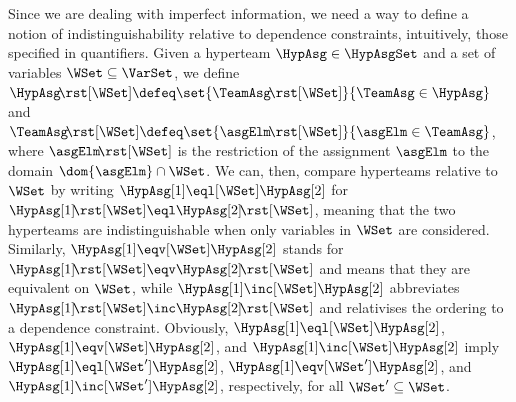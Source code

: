 \documentclass[authoryear]{elsarticle}
\begin{document}
Since we are dealing with imperfect information, we need a way to define a
notion of indistinguishability relative to dependence constraints, intuitively,
those specified in quantifiers.
Given a hyperteam $\HypAsg \in \HypAsgSet$ and a set of variables $\WSet
\subseteq \VarSet$, we define $\HypAsg \!\rst[\WSet] \defeq \allowbreak \set{
\TeamAsg \!\rst[\WSet] }{ \TeamAsg \in \HypAsg }$ and $\TeamAsg \!\rst[\WSet]
\defeq \allowbreak \set{ \asgElm \!\rst[\WSet] }{ \asgElm \in \TeamAsg }$, where
$\asgElm \!\rst[\WSet]$ is the restriction of the assignment $\asgElm$ to the
domain $\dom{\asgElm} \cap \WSet$.
%
We can, then, compare hyperteams relative to $\WSet$ by writing $\HypAsg[1]
\eql[\WSet] \HypAsg[2]$ for $\HypAsg[1] \!\rst[\WSet] \eql \HypAsg[2]
\!\rst[\WSet]$, meaning that the two hyperteams are indistinguishable when only
variables in $\WSet$ are considered.
Similarly, $\HypAsg[1] \eqv[\WSet] \HypAsg[2]$ stands for $\HypAsg[1]
\!\rst[\WSet] \eqv \HypAsg[2] \!\rst[\WSet]$ and means that they are equivalent
on $\WSet$, while $\HypAsg[1] \inc[\WSet] \HypAsg[2]$ abbreviates $\HypAsg[1]
\!\rst[\WSet] \inc \HypAsg[2] \!\rst[\WSet]$ and relativises the ordering to a
dependence constraint.
Obviously, $\HypAsg[1] \eql[\WSet] \HypAsg[2]$, $\HypAsg[1] \eqv[\WSet]
\HypAsg[2]$, and $\HypAsg[1] \inc[\WSet] \HypAsg[2]$ imply $\HypAsg[1]
\eql[\WSet'] \HypAsg[2]$, $\HypAsg[1] \eqv[\WSet'] \HypAsg[2]$, and $\HypAsg[1]
\inc[\WSet'] \HypAsg[2]$, respectively, for all $\WSet' \subseteq \WSet$.
\end{document}
